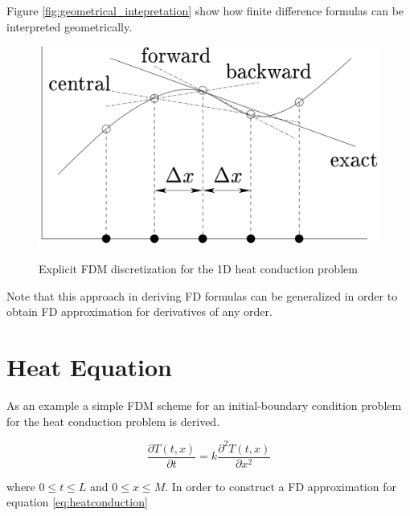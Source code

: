     Figure \ref{fig:geometrical_intepretation} show how finite difference formulas can be interpreted geometrically.
    \begin{figure}
\centering
\includegraphics[scale=0.3]{./images/CA_FDM/geometrical_interpretation_fd}
\label{fig:geometrical_intepretation}
\caption{Explicit FDM discretization for the 1D heat conduction problem}\label{torus}
\end{figure} 
    
Note that this approach in deriving FD formulas can be generalized in order to obtain FD approximation for derivatives of any order.
    \section{Heat Equation}
        As an example a simple FDM scheme for an initial-boundary condition problem for the heat conduction problem is derived. 
    
\begin{equation}
    \frac{\partial T(t,x)}{\partial t}= k\frac{\partial^2
      T(t,x)}{\partial x^2}
      \label{eq:heatconduction}
\end{equation}
 
    where $0 \leq t \leq L$ and $0 \leq x \leq
    M$. 
 In order to construct a FD approximation for equation \ref{eq:heatconduction} 
 
